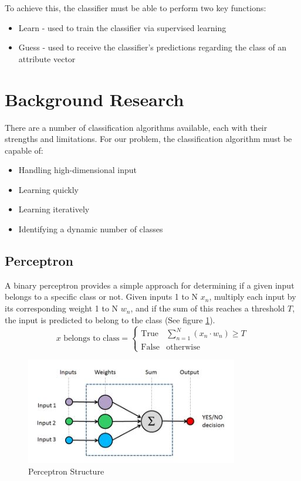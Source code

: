 To achieve this, the classifier must be able to perform two key functions:
\begin{itemize}
    \item Learn - used to train the classifier via supervised learning
    \item Guess - used to receive the classifier's predictions regarding the class of an attribute vector
\end{itemize}

\section{Background Research}
There are a number of classification algorithms available, each with their strengths and limitations. For our problem, the classification algorithm must be capable of:
\begin{itemize}
    \item Handling high-dimensional input
    \item Learning quickly
    \item Learning iteratively
    \item Identifying a dynamic number of classes
\end{itemize}

\newpage
\subsection{Perceptron}
A binary perceptron provides a simple approach for determining if a given input belongs to a specific class or not. Given inputs 1 to N $x_n$, multiply each input by its corresponding weight 1 to N $w_n$, and if the sum of this reaches a threshold $T$, the input is predicted to belong to the class \citep{perceptron} (See figure \ref{fig:perceptron_img}).
$$ 
x \text{ belongs to class} = 
\begin{cases}
\mbox{True} &
\sum_{n=1}^{N} (x_n \cdot w_n) \geq T \\
\mbox{False} & \text{otherwise}
\end{cases}
$$

\begin{figure}[H]
    \centering
    \includegraphics{figs/8/perceptron_img}
    \caption{Perceptron Structure}
    \label{fig:perceptron_img}
\end{figure}

